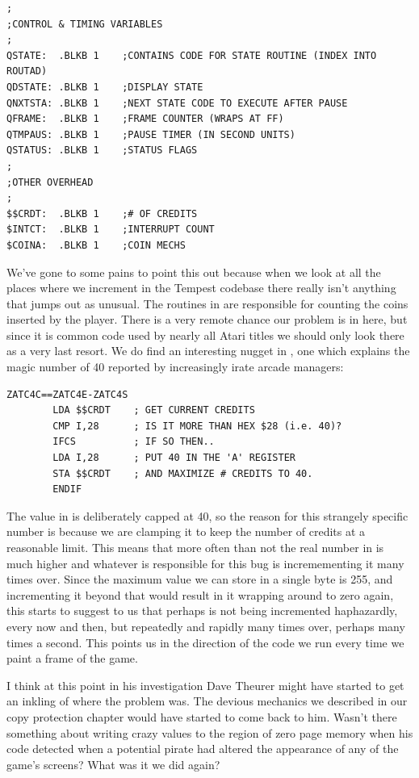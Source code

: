 \begin{lstlisting}
;
;CONTROL & TIMING VARIABLES
;
QSTATE:  .BLKB 1    ;CONTAINS CODE FOR STATE ROUTINE (INDEX INTO ROUTAD)
QDSTATE: .BLKB 1    ;DISPLAY STATE
QNXTSTA: .BLKB 1    ;NEXT STATE CODE TO EXECUTE AFTER PAUSE
QFRAME:  .BLKB 1    ;FRAME COUNTER (WRAPS AT FF)
QTMPAUS: .BLKB 1    ;PAUSE TIMER (IN SECOND UNITS)
QSTATUS: .BLKB 1    ;STATUS FLAGS
;
;OTHER OVERHEAD
;
$$CRDT:  .BLKB 1    ;# OF CREDITS
$INTCT:  .BLKB 1    ;INTERRUPT COUNT
$COINA:  .BLKB 1    ;COIN MECHS
\end{lstlisting}

We've gone to some pains to point this out because when we look at all the places where we increment  in the
Tempest codebase there really isn't anything that jumps out as unusual. The routines in  are responsible for
counting the coins inserted by the player. There is a very remote chance our problem is in here, but since it is common code used
by nearly all Atari titles we should only look there as a very last resort. We do find an interesting nugget in , one
which explains the magic number of 40 reported by increasingly irate arcade managers:

\begin{lstlisting}
ZATC4C==ZATC4E-ZATC4S
        LDA $$CRDT    ; GET CURRENT CREDITS
        CMP I,28      ; IS IT MORE THAN HEX $28 (i.e. 40)?
        IFCS          ; IF SO THEN.. 
        LDA I,28      ; PUT 40 IN THE 'A' REGISTER
        STA $$CRDT    ; AND MAXIMIZE # CREDITS TO 40.
        ENDIF
\end{lstlisting}

The value in  is deliberately capped at 40, so the reason for this strangely specific number is because we are
clamping it to keep the number of credits at a reasonable limit. This means that more often than not the real number in 
is much higher and whatever is responsible for this
bug is incremementing it many times over. Since the maximum value we can store in a single byte is 255, and incrementing it beyond
that would result in it wrapping around to zero again, this starts to suggest to us that perhaps  is not being incremented
haphazardly, every now and then, but repeatedly and rapidly many times over, perhaps many times a second. This points us in the direction
of the code we run every time we paint a frame of the game. 

I think at this point in his investigation Dave Theurer might have started to get an inkling of where the problem was. The devious
mechanics we described in our copy protection chapter would have started to come back to him. Wasn't there something about writing
crazy values to the region of zero page memory when his code detected when a potential pirate had altered the appearance of any of the
game's screens? What was it we did again?

